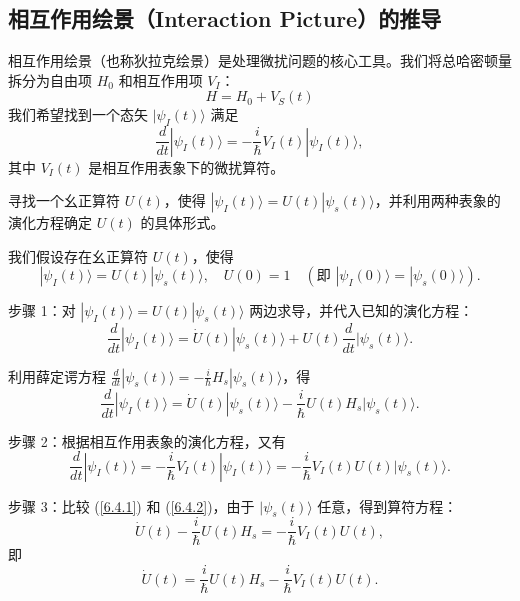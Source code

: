 \subsection{相互作用绘景（Interaction Picture）的推导}

相互作用绘景（也称狄拉克绘景）是处理微扰问题的核心工具。我们将总哈密顿量拆分为自由项 $H_0$ 和相互作用项 $V_I$：
\begin{equation}
	H = H_0 + V_S(t)
\end{equation}
我们希望找到一个态矢 \( |\psi_I(t)\rangle \) 满足
\begin{equation}
	\frac{d}{dt} |\psi_I(t)\rangle = -\frac{i}{\hbar} V_I(t) |\psi_I(t)\rangle,
\end{equation}
其中 \( V_I(t) \) 是相互作用表象下的微扰算符。

寻找一个幺正算符 \( U(t) \)，使得 \( |\psi_I(t)\rangle = U(t) |\psi_s(t)\rangle \)，并利用两种表象的演化方程确定 \( U(t) \) 的具体形式。

我们假设存在幺正算符 \( U(t) \)，使得
\begin{equation}
	|\psi_I(t)\rangle = U(t) |\psi_s(t)\rangle,
	\quad U(0) = 1 \quad (\text{即 } |\psi_I(0)\rangle = |\psi_s(0)\rangle).
\end{equation}

步骤 1：对 \( |\psi_I(t)\rangle = U(t) |\psi_s(t)\rangle \) 两边求导，并代入已知的演化方程：
\begin{equation}
	\frac{d}{dt} |\psi_I(t)\rangle = \dot{U}(t) |\psi_s(t)\rangle + U(t) \frac{d}{dt} |\psi_s(t)\rangle.
\end{equation}

利用薛定谔方程 \(\displaystyle \frac{d}{dt} |\psi_s(t)\rangle = -\frac{i}{\hbar} H_s |\psi_s(t)\rangle \)，得
\begin{equation}
	\frac{d}{dt} |\psi_I(t)\rangle = \dot{U}(t) |\psi_s(t)\rangle - \frac{i}{\hbar} U(t) H_s |\psi_s(t)\rangle. \label{6.4.1}
\end{equation}

步骤 2：根据相互作用表象的演化方程，又有
\begin{equation}
	\frac{d}{dt} |\psi_I(t)\rangle = -\frac{i}{\hbar} V_I(t) |\psi_I(t)\rangle = -\frac{i}{\hbar} V_I(t) U(t) |\psi_s(t)\rangle. \label{6.4.2}
\end{equation}

步骤 3：比较 (\ref{6.4.1}) 和 (\ref{6.4.2})，由于 \( |\psi_s(t)\rangle \) 任意，得到算符方程：
\begin{equation}
	\dot{U}(t) - \frac{i}{\hbar} U(t) H_s = -\frac{i}{\hbar} V_I(t) U(t),
\end{equation}
即
\begin{equation}
	\dot{U}(t) = \frac{i}{\hbar} U(t) H_s - \frac{i}{\hbar} V_I(t) U(t). \label{6.4.3}
\end{equation}

